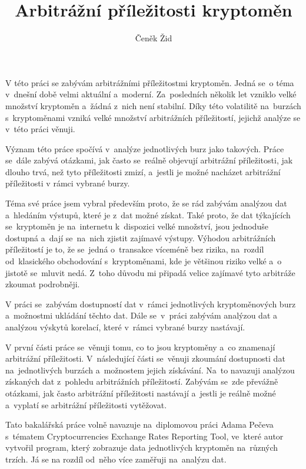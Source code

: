 \documentclass[thesis=B,czech]{FITthesis}[2019/03/21]
\title{Arbitrážní příležitosti kryptoměn}
\author{Čeněk Žid} %
\begin{document}

\begin{introduction}
V této práci se zabývám arbitrážními příležitostmi kryptoměn. Jedná se~o téma v~dnešní době velmi aktuální a~moderní. Za~posledních několik let vzniklo velké množství kryptoměn a~žádná z~nich není stabilní. Díky této volatilitě na~burzách s~kryptoměnami vzniká velké množství arbitrážních příležitostí, jejichž analýze se v~této práci věnuji.

Význam této práce spočívá v~analýze jednotlivých burz jako takových. Práce se~dále zabývá otázkami, jak často se~reálně objevují arbitrážní příležitosti, jak dlouho trvá, než tyto příležitosti zmizí, a~jestli je možné nacházet arbitrážní příležitosti v rámci vybrané burzy.

Téma své práce jsem vybral především proto, že se rád zabývám analýzou dat a~hledáním výstupů, které je z~dat možné získat. Také proto, že dat týkajících se~kryptoměn je na~internetu k~dispozici velké množství, jsou jednoduše dostupná a~dají se~na~nich zjistit zajímavé výstupy. Výhodou arbitrážních příležitostí je to, že se~jedná o~transakce víceméně bez rizika, na~rozdíl od~klasického obchodování s~kryptoměnami, kde je většinou riziko velké a~o jistotě se~mluvit nedá. Z~toho důvodu mi připadá velice zajímavé tyto arbitráže zkoumat podrobněji. 

V práci se~zabývám dostupností dat v~rámci jednotlivých kryptoměnových burz a~možnostmi ukládání těchto dat. Dále se~v~práci zabývám analýzou dat a analýzou výskytů korelací, které v~rámci vybrané burzy nastávají.

V první části práce se~věnuji tomu, co to jsou kryptoměny a~co znamenají arbitrážní příležitosti. V~následující části se~věnuji zkoumání dostupnosti dat na~jednotlivých burzách a~možnostem jejich získávání. Na~to navazuji analýzou získaných dat z~pohledu arbitrážních příležitostí. Zabývám se~zde převážně otázkami, jak často arbitrážní příležitosti nastávají a~jestli je reálně možné a~vyplatí se arbitrážní příležitosti vytěžovat.

Tato bakalářská práce volně navazuje na~diplomovou práci Adama Pečeva s~tématem Cryptocurrencies Exchange Rates Reporting Tool, ve~které autor vytvořil program, který zobrazuje data jednotlivých kryptoměn na~různých trzích. Já se na rozdíl od~něho více zaměřuji na~analýzu dat.
\end{introduction}
\end{document}
